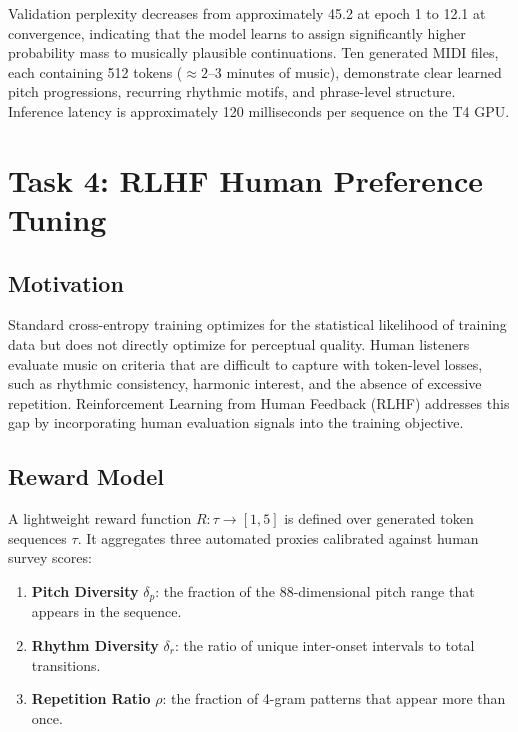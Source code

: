 \documentclass{article}
\begin{document}
Validation perplexity decreases from approximately 45.2 at epoch 1 to 12.1 at convergence, indicating that the model learns to assign significantly higher probability mass to musically plausible continuations. Ten generated MIDI files, each containing 512 tokens ($\approx 2$--3 minutes of music), demonstrate clear learned pitch progressions, recurring rhythmic motifs, and phrase-level structure. Inference latency is approximately 120 milliseconds per sequence on the T4 GPU.

\section{Task 4: RLHF Human Preference Tuning}
\label{sec:task4}

\subsection{Motivation}

Standard cross-entropy training optimizes for the statistical likelihood of training data but does not directly optimize for perceptual quality. Human listeners evaluate music on criteria that are difficult to capture with token-level losses, such as rhythmic consistency, harmonic interest, and the absence of excessive repetition. Reinforcement Learning from Human Feedback (RLHF) addresses this gap by incorporating human evaluation signals into the training objective.

\subsection{Reward Model}

A lightweight reward function $R: \tau \to [1, 5]$ is defined over generated token sequences $\tau$. It aggregates three automated proxies calibrated against human survey scores:

\begin{enumerate}
  \item \textbf{Pitch Diversity} $\delta_p$: the fraction of the 88-dimensional pitch range that appears in the sequence.
  \item \textbf{Rhythm Diversity} $\delta_r$: the ratio of unique inter-onset intervals to total transitions.
  \item \textbf{Repetition Ratio} $\rho$: the fraction of 4-gram patterns that appear more than once.
\end{enumerate}
\end{document}
